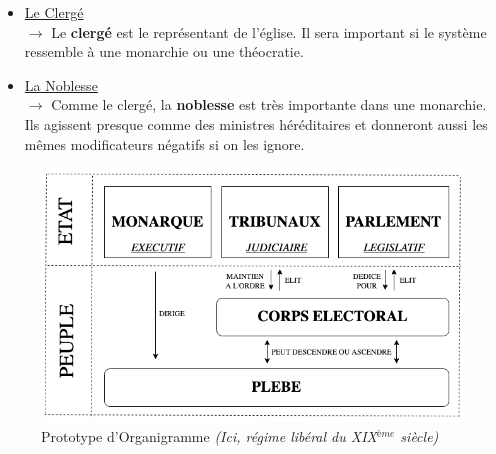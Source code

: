 \documentclass{article}
\begin{document}
\begin{itemize}
                            \item \underline{Le Clergé}\\
                                $\rightarrow$ Le \textbf{clergé} est le représentant de l’église. Il sera important si le système ressemble à une monarchie ou une théocratie. 
                            \item \underline{La Noblesse }\\
                                $\rightarrow$ Comme le clergé, la \textbf{noblesse} est très importante dans une monarchie. Ils agissent presque comme des ministres héréditaires et donneront aussi les mêmes modificateurs négatifs si on les ignore.
                            
                        \end{itemize}
                    
                    \begin{figure}[h]
                        \centering
                            \includegraphics[scale=0.4]{schema_organigramme.png}
                            \caption{Prototype d'Organigramme \textit{(Ici, régime libéral du XIX$^{ème}$ siècle)}}
                            \label{fig:x photosysteme}
                    \end{figure}
\end{document}
